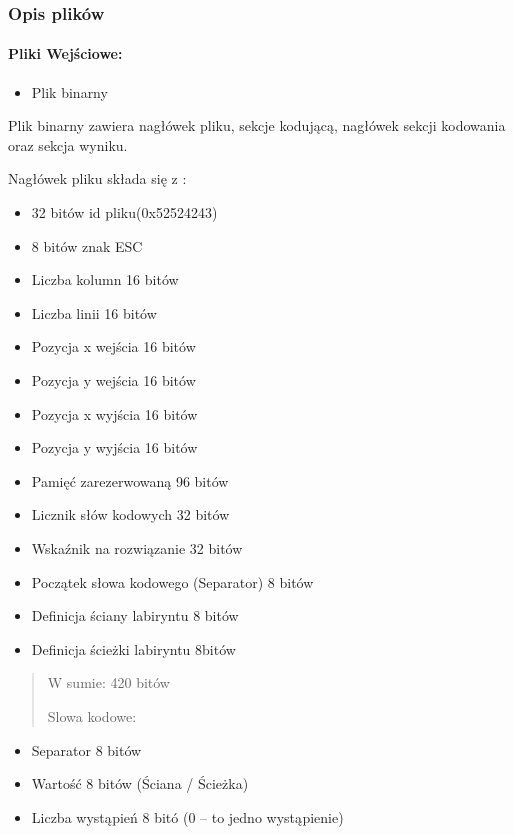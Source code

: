 \documentclass[
]{article}
\begin{document}
\hypertarget{opis-plikuxf3w}{%
\subsubsection{Opis plików}\label{opis-plikuxf3w}}

\hypertarget{pliki-wejux15bciowe}{%
\paragraph{Pliki Wejściowe:}\label{pliki-wejux15bciowe}}

\begin{itemize}
\item
  Plik binarny
\end{itemize}

Plik binarny zawiera nagłówek pliku, sekcje kodującą, nagłówek sekcji
kodowania oraz sekcja wyniku.

Nagłówek pliku składa się z :

\begin{itemize}
\item
  32 bitów id pliku(0x52524243)
\item
  8 bitów znak ESC
\item
  Liczba kolumn 16 bitów
\item
  Liczba linii 16 bitów
\item
  Pozycja x wejścia 16 bitów
\item
  Pozycja y wejścia 16 bitów
\item
  Pozycja x wyjścia 16 bitów
\item
  Pozycja y wyjścia 16 bitów
\item
  Pamięć zarezerwowaną 96 bitów
\item
  Licznik słów kodowych 32 bitów
\item
  Wskaźnik na rozwiązanie 32 bitów
\item
  Początek słowa kodowego (Separator) 8 bitów
\item
  Definicja ściany labiryntu 8 bitów
\item
  Definicja ścieżki labiryntu 8bitów
\end{itemize}

\begin{quote}
W sumie: 420 bitów

Slowa kodowe:
\end{quote}

\begin{itemize}
\item
  Separator 8 bitów
\item
  Wartość 8 bitów (Ściana / Ścieżka)
\item
  Liczba wystąpień 8 bitó (0 -- to jedno wystąpienie)
\end{itemize}
\end{document}
